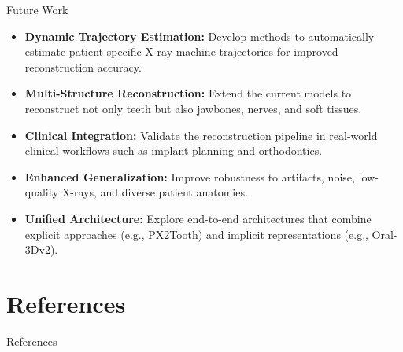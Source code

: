 \documentclass[aspectratio=169]{beamer}
\begin{document}
\begin{frame}{Future Work}
\begin{itemize}
    \item \textbf{Dynamic Trajectory Estimation:}  
    Develop methods to automatically estimate patient-specific X-ray machine trajectories for improved reconstruction accuracy. \cite{park2024nebla}

    \item \textbf{Multi-Structure Reconstruction:}  
    Extend the current models to reconstruct not only teeth but also jawbones, nerves, and soft tissues.\cite{mildenhall2021nerf}

    \item \textbf{Clinical Integration:}  
    Validate the reconstruction pipeline in real-world clinical workflows such as implant planning and orthodontics.\cite{wang2024neural}

    \item \textbf{Enhanced Generalization:}  
    Improve robustness to artifacts, noise, low-quality X-rays, and diverse patient anatomies.

    \item \textbf{Unified Architecture:}  
    Explore end-to-end architectures that combine explicit approaches (e.g., PX2Tooth) and implicit representations (e.g., Oral-3Dv2).\cite{song2023oral}
\end{itemize}
\end{frame}

\section{References}

\begin{frame}[allowframebreaks]{References}
    \printbibliography
\end{frame}
\end{document}
